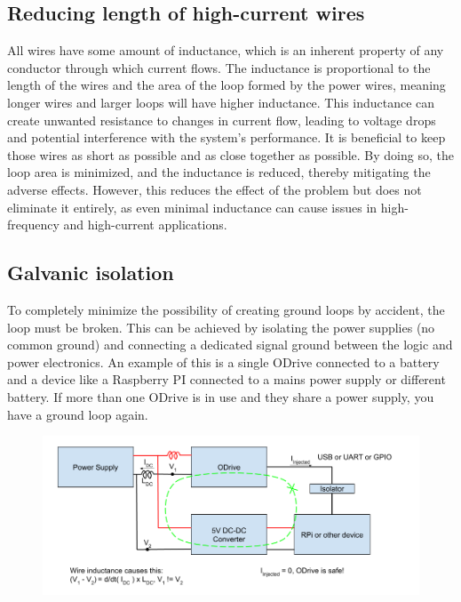 \subsection{Reducing length of high-current wires}

All wires have some amount of inductance, which is an inherent property of any conductor through which current flows. The inductance is proportional to the length of the wires and the area of the loop formed by the power wires, meaning longer wires and larger loops will have higher inductance. This inductance can create unwanted resistance to changes in current flow, leading to voltage drops and potential interference with the system's performance. It is beneficial to keep those wires as short as possible and as close together as possible. By doing so, the loop area is minimized, and the inductance is reduced, thereby mitigating the adverse effects. However, this reduces the effect of the problem but does not eliminate it entirely, as even minimal inductance can cause issues in high-frequency and high-current applications.

\subsection{Galvanic isolation}

To completely minimize the possibility of creating ground loops by accident, the loop must be broken. This can be achieved by isolating the power supplies (no common ground) and connecting a dedicated signal ground between the logic and power electronics. An example of this is a single ODrive connected to a battery and a device like a Raspberry PI connected to a mains power supply or different battery. If more than one ODrive is in use and they share a power supply, you have a ground loop again.

\begin{figure}[h]
\includegraphics[width=\textwidth]{contents/figures/ground_loop_fix.png}
\end{figure}

